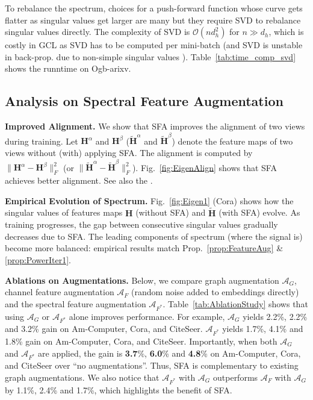 To rebalance the spectrum, choices for a push-forward function whose curve gets  flatter as singular values get larger  are many but they require SVD to rebalance singular values directly. %
The complexity of SVD is $\mathcal{O}(nd_h^2)$ for $n\!\gg\!d_h$, which is costly in GCL as  SVD has to be computed per mini-batch (and SVD is unstable in back-prop. due to non-simple singular values ).  Table~\ref{tab:time_comp_svd} shows the runntime on  Ogb-arixv. 

\subsection{Analysis on Spectral Feature Augmentation}
\label{sec:spectrum}
\noindent\textbf{Improved Alignment.}
We show that SFA improves the alignment of two views during training. Let $\mathbf{H}^\alpha$ and $\mathbf{H}^\beta$ ($\widetilde{\mathbf{H}}^\alpha$ and $\widetilde{\mathbf{H}}^\beta$) denote the feature maps of two views without (with) applying SFA. The alignment is computed by $\|\mathbf{H}^\alpha -\mathbf{H}^\beta\|^2_F$ (or $\|\tilde{\mathbf{H}}^\alpha -\tilde{\mathbf{H}}^\beta\|^2_F$). Fig.~\ref{fig:EigenAlign}  shows that SFA achieves better alignment. See also the .

\vspace{0.1cm}
\noindent\textbf{Empirical Evolution of Spectrum.}
Fig.~\ref{fig:Eigen1} (Cora) shows how the singular values of  features maps ${\mathbf{H}}$ (without SFA) and $\tilde{\mathbf{H}}$ (with SFA) evolve. As training progresses, the gap between consecutive singular values gradually decreases due to SFA. The leading components of spectrum (where the signal is) become more balanced: empirical results match Prop.~\ref{prop:FeatureAug} \&  \ref{prop:PowerIter1}.

\vspace{0.1cm}
\noindent\textbf{Ablations on Augmentations.}
Below, %
we compare graph augmentation $\mathcal{A}_G$, channel feature augmentation $\mathcal{A}_F$ (random noise  added to embeddings directly) and the spectral feature augmentation $\mathcal{A}_{F^*}$.  Table~\ref{tab:AblationStudy} shows that using $\mathcal{A}_G$ or $\mathcal{A}_{F^*}$ alone  improves performance. For example, $\mathcal{A}_G$ yields 2.2\%, 2.2\% and 3.2\% gain on Am-Computer, Cora, and CiteSeer. $\mathcal{A}_{F^*}$ yields 1.7\%, 4.1\% and 1.8\% gain on  Am-Computer, Cora, and CiteSeer. Importantly, when both $\mathcal{A}_G$ and $\mathcal{A}_{F^*}$ are applied, the gain is \textbf{3.7}\%, \textbf{6.0}\% and \textbf{4.8}\% on Am-Computer, Cora, and CiteSeer over ``no augmentations''. Thus, SFA is complementary to existing graph augmentations. We also notice that $\mathcal{A}_{F^*}$ with $\mathcal{A}_G$ outperforms $\mathcal{A}_{F}$ with $\mathcal{A}_G$ by 1.1\%, 2.4\% and 1.7\%, which highlights the benefit of SFA.



